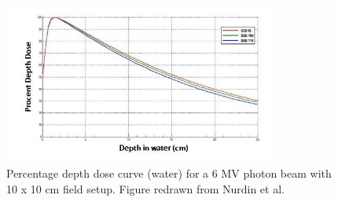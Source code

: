\begin{figure}[H]
	\begin{center}
		\includegraphics[width=0.8\textwidth]{figures/pdd}
		\caption{Percentage depth dose curve (water) for a 6 MV photon beam with 10 x 10 cm field setup. Figure redrawn from Nurdin et al. \cite{Nurdin}}
		\label{fig:pdd}
	\end{center}
\end{figure}
